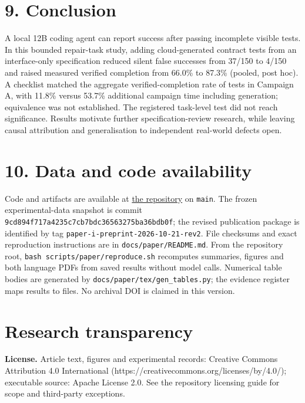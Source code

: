 \documentclass[11pt]{article}
\newcommand{\code}[1]{\texttt{#1}}
\begin{document}
\section*{9. Conclusion}
A local 12B coding agent can report success after passing incomplete visible tests. In this bounded repair-task study, adding cloud-generated contract tests from an interface-only specification reduced silent false successes from 37/150 to 4/150 and raised measured verified completion from 66.0\% to 87.3\% (pooled, post hoc). A checklist matched the aggregate verified-completion rate of tests in Campaign A, with 11.8\% versus 53.7\% additional campaign time including generation; equivalence was not established. The registered task-level test did not reach significance. Results motivate further specification-review research, while leaving causal attribution and generalisation to independent real-world defects open.

\section*{10. Data and code availability}
Code and artifacts are available at \href{https://github.com/cyberdid/cloud-edge-ai-orchestrator}{the repository} on \code{main}. The frozen experimental-data snapshot is commit \code{9cd894f717a4235c7cb7bdc36563275ba36bdb0f}; the revised publication package is identified by tag \code{paper-\allowbreak{}i-\allowbreak{}preprint-\allowbreak{}2026-\allowbreak{}10-\allowbreak{}21-\allowbreak{}rev2}. File checksums and exact reproduction instructions are in \code{docs/\allowbreak{}paper/\allowbreak{}README.\allowbreak{}md}. From the repository root, \code{bash scripts/\allowbreak{}paper/\allowbreak{}reproduce.\allowbreak{}sh} recomputes summaries, figures and both language PDFs from saved results without model calls. Numerical table bodies are generated by \code{docs/\allowbreak{}paper/\allowbreak{}tex/\allowbreak{}gen\_\allowbreak{}tables.\allowbreak{}py}; the evidence register maps results to files. No archival DOI is claimed in this version.

\section*{Research transparency}
\textbf{License.} Article text, figures and experimental records: Creative Commons Attribution 4.0 International (https://creativecommons.org/licenses/by/4.0/); executable source: Apache License 2.0. See the repository licensing guide for scope and third-party exceptions.
\end{document}
